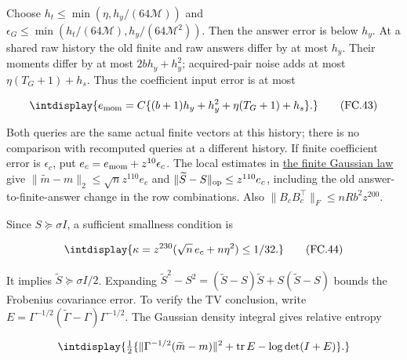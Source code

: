 
Choose \(h_t\le\min(\eta,\allowbreak h_y/(64\mathcal M))\) and \(\epsilon_G\le\min(h_t/(64\mathcal M),\allowbreak h_y/(64\mathcal M^2))\). Then the answer error is below \(h_y\). At a shared raw history the old finite and raw answers differ by at most \(h_y\). Their moments differ by at most \(2bh_y+h_y^2\); acquired-pair noise adds at most \(\eta(T_G+1)+h_s\). Thus the coefficient input error is at most


\begingroup\renewcommand{\theHequation}{intdisplay.745}
\begin{equation}
\intdisplay{
e_{\rm mom}=C\{(b+1)h_y+h_y^2+\eta(T_G+1)+h_s\}.
}
\tag{FC.43}
\label{int:eq-0348-fc-43}
\end{equation}
\endgroup


Both queries are the same actual finite vectors at this history; there is no comparison with recomputed queries at a different history. If finite coefficient error is \(\epsilon_c\), put \(e_c=e_{\rm mom}+z^{10}\epsilon_c\). The local estimates in \hyperref[int:decoder-gaussian-law]{the finite Gaussian law} give \(\|\widetilde m-m\|_2\le\sqrt n z^{110}e_c\) and \(\|\widetilde S-S\|_{\rm op}\le z^{110}e_c\), including the old answer-to-finite-answer change in the row combinations. Also \(\|B_cB_c^\top\|_F\le nRb^2z^{200}\).



Since \(S\succeq\sigma I\), a sufficient smallness condition is


\begingroup\renewcommand{\theHequation}{intdisplay.746}
\begin{equation}
\intdisplay{
\kappa=z^{230}(\sqrt n\,e_c+n\eta^2)\le1/32.
}
\tag{FC.44}
\label{int:eq-0349-fc-44}
\end{equation}
\endgroup


It implies \(\widetilde S\succeq\sigma I/2\). Expanding \(\widetilde S^2-S^2=(\widetilde S-S)\widetilde S+S(\widetilde S-S)\) bounds the Frobenius covariance error. To verify the TV conclusion, write \(E=\Gamma^{-1/2}(\widetilde\Gamma-\Gamma)\Gamma^{-1/2}\). The Gaussian density integral gives relative entropy


\begingroup\renewcommand{\theHequation}{intdisplay.747}
\begin{equation*}
\intdisplay{
\tfrac12\{\|\Gamma^{-1/2}(\widetilde m-m)\|^2+
\operatorname{tr}E-\log\det(I+E)\}.
}
\end{equation*}
\endgroup

